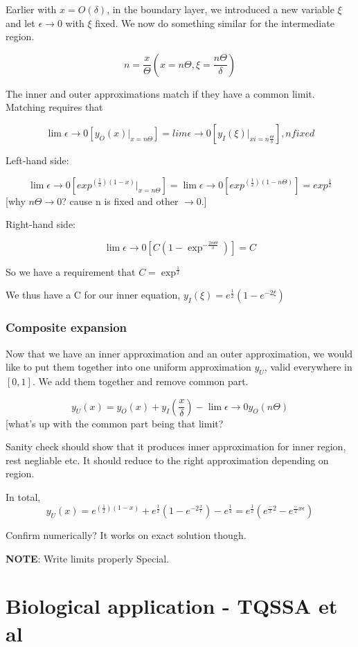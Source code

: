 \documentclass[12pt]{report}
\begin{document}
Earlier with $x=O(\delta)$, in the boundary layer, we introduced a new
variable $\xi$ and let $\epsilon \to 0$ with $\xi$ fixed. We now do
something similar for the intermediate region.

$$n = \frac x \Theta (x = n \Theta, \xi = \frac{n \Theta}{\delta})$$

The inner and outer approximations match if they have a common
limit. Matching requires that

$$\lim \epsilon \to 0[y_O(x) |_{x=n \Theta}] = lim \epsilon \to
0[y_I(\xi)|_{xi=n \frac \Theta \delta}], n fixed$$

Left-hand side:

$$\lim \epsilon \to 0[exp^{(\frac 1 2)(1-x)} |_{x=n \Theta}] = \lim
\epsilon \to 0[exp^{(\frac 1 2)(1- n \Theta)}] = exp^{\frac 1 2} $$
[why $n \Theta \to 0$?  cause n is fixed and other $\to 0$.]

Right-hand side:

$$\lim \epsilon \to 0[C(1-\exp^{-\frac{2n \Theta}{\delta}})] = C$$

So we have a requirement that $C = \exp^{\frac 1 2}$

We thus have a C for our inner equation,
$y_I(\xi) = e^{\frac 1 2}(1-e^{-2\xi})$

\subsection{Composite expansion}

Now that we have an inner approximation and an outer approximation, we
would like to put them together into one uniform approximation $y_U$,
valid everywhere in $[0,1]$. We add them together and remove common part.

$$y_U(x) = y_O(x) + y_I(\frac x \delta) - \lim \epsilon \to 0 y_O(n \Theta)$$
[what's up with the common part being that limit?

Sanity check should show that it produces inner approximation for
inner region, rest negliable etc. It should reduce to the right
approximation depending on region.

In total, $$y_U(x) = e^{(\frac 1 2)(1-x)} + e^{\frac 1 2}(1 -
		e^{-2\frac x \epsilon}) - e^{\frac 1 2} = e^{\frac 1 2}(e^{\frac -x 2}
			- e^{\frac -2x \epsilon})$$

Confirm numerically? It works on exact solution though.

\textbf{NOTE}: Write limits properly Special.

\chapter{Biological application - TQSSA et al}
\end{document}
